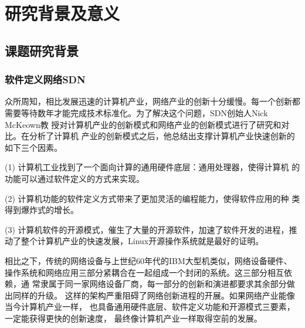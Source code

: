 \section{研究背景及意义}
\subsection{课题研究背景}
\subsubsection{软件定义网络SDN}
众所周知，相比发展迅速的计算机产业，网络产业的创新十分缓慢。每一个创新都 需要等待数年才能完成技术标准化。为了解决这个问题，SDN创始人Nick McKeown教 授对计算机产业的创新模式和网络产业的创新模式进行了研究和对比。在分析了计算机 产业的创新模式之后，他总结出支撑计算机产业快速创新的如下三个因素。

(1)	计算机工业找到了一个面向计算的通用硬件底层：通用处理器，使得计算机 的功能可以通过软件定义的方式来实现。

(2)	计算机功能的软件定义方式带来了更加灵活的编程能力，使得软件应用的种 类得到爆炸式的增长。

(3)	计算机软件的开源模式，催生了大量的开源软件，加速了软件开发的进程，推动了整个计算机产业的快速发展，Linux开源操作系统就是最好的证明。

相比之下，传统的网络设备与上世纪60年代的IBM大型机类似，网络设备硬件、 操作系统和网络应用三部分紧耦合在一起组成一个封闭的系统。这三部分相互依赖，通 常隶属于同一家网络设备厂商，每一部分的创新和演进都要求其余部分做出同样的升级。 这样的架构严重阻碍了网络创新进程的开展。如果网络产业能像当今计算机产业一样， 也具备通用硬件底层、软件定义功能和开源模式三要素，一定能获得更快的创新速度， 最终像计算机产业一样取得空前的发展。

